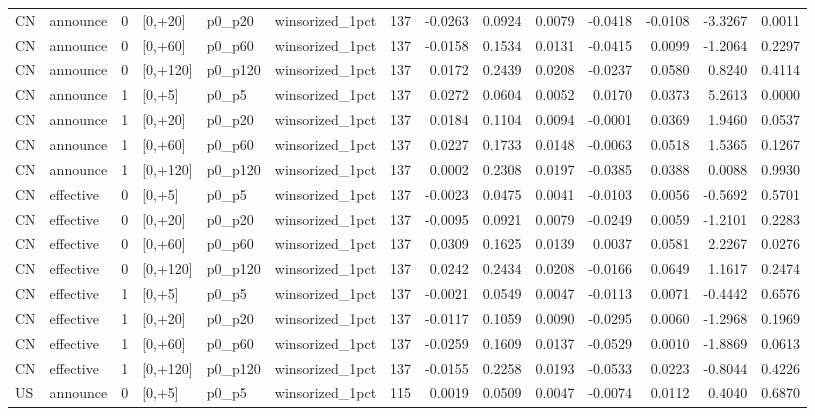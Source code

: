 \begin{tabular}{llrlllrrrrrrrr}
CN & announce & 0 & [0,+20] & p0_p20 & winsorized_1pct & 137 & -0.0263 & 0.0924 & 0.0079 & -0.0418 & -0.0108 & -3.3267 & 0.0011 \\
CN & announce & 0 & [0,+60] & p0_p60 & winsorized_1pct & 137 & -0.0158 & 0.1534 & 0.0131 & -0.0415 & 0.0099 & -1.2064 & 0.2297 \\
CN & announce & 0 & [0,+120] & p0_p120 & winsorized_1pct & 137 & 0.0172 & 0.2439 & 0.0208 & -0.0237 & 0.0580 & 0.8240 & 0.4114 \\
CN & announce & 1 & [0,+5] & p0_p5 & winsorized_1pct & 137 & 0.0272 & 0.0604 & 0.0052 & 0.0170 & 0.0373 & 5.2613 & 0.0000 \\
CN & announce & 1 & [0,+20] & p0_p20 & winsorized_1pct & 137 & 0.0184 & 0.1104 & 0.0094 & -0.0001 & 0.0369 & 1.9460 & 0.0537 \\
CN & announce & 1 & [0,+60] & p0_p60 & winsorized_1pct & 137 & 0.0227 & 0.1733 & 0.0148 & -0.0063 & 0.0518 & 1.5365 & 0.1267 \\
CN & announce & 1 & [0,+120] & p0_p120 & winsorized_1pct & 137 & 0.0002 & 0.2308 & 0.0197 & -0.0385 & 0.0388 & 0.0088 & 0.9930 \\
CN & effective & 0 & [0,+5] & p0_p5 & winsorized_1pct & 137 & -0.0023 & 0.0475 & 0.0041 & -0.0103 & 0.0056 & -0.5692 & 0.5701 \\
CN & effective & 0 & [0,+20] & p0_p20 & winsorized_1pct & 137 & -0.0095 & 0.0921 & 0.0079 & -0.0249 & 0.0059 & -1.2101 & 0.2283 \\
CN & effective & 0 & [0,+60] & p0_p60 & winsorized_1pct & 137 & 0.0309 & 0.1625 & 0.0139 & 0.0037 & 0.0581 & 2.2267 & 0.0276 \\
CN & effective & 0 & [0,+120] & p0_p120 & winsorized_1pct & 137 & 0.0242 & 0.2434 & 0.0208 & -0.0166 & 0.0649 & 1.1617 & 0.2474 \\
CN & effective & 1 & [0,+5] & p0_p5 & winsorized_1pct & 137 & -0.0021 & 0.0549 & 0.0047 & -0.0113 & 0.0071 & -0.4442 & 0.6576 \\
CN & effective & 1 & [0,+20] & p0_p20 & winsorized_1pct & 137 & -0.0117 & 0.1059 & 0.0090 & -0.0295 & 0.0060 & -1.2968 & 0.1969 \\
CN & effective & 1 & [0,+60] & p0_p60 & winsorized_1pct & 137 & -0.0259 & 0.1609 & 0.0137 & -0.0529 & 0.0010 & -1.8869 & 0.0613 \\
CN & effective & 1 & [0,+120] & p0_p120 & winsorized_1pct & 137 & -0.0155 & 0.2258 & 0.0193 & -0.0533 & 0.0223 & -0.8044 & 0.4226 \\
US & announce & 0 & [0,+5] & p0_p5 & winsorized_1pct & 115 & 0.0019 & 0.0509 & 0.0047 & -0.0074 & 0.0112 & 0.4040 & 0.6870 \\

\end{tabular}
